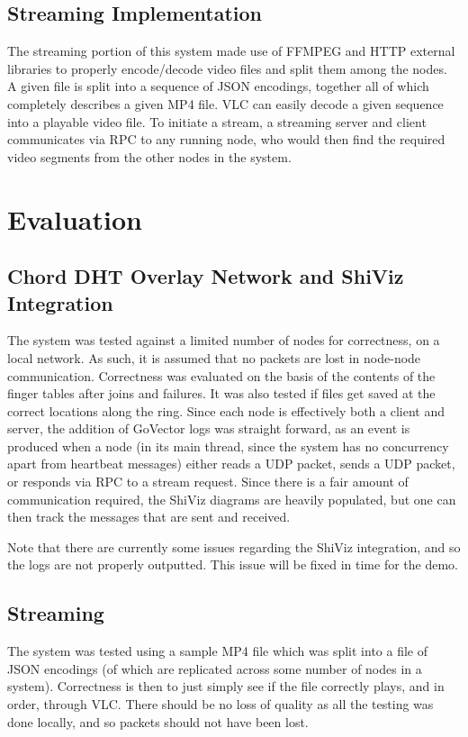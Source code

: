 \documentclass[fleqn,24pt]{SelfArx} %
\begin{document}
\subsection{Streaming Implementation}

The streaming portion of this system made use of FFMPEG and HTTP external libraries to properly encode/decode video files and split them among the nodes. A given file is split into a sequence of JSON encodings, together all of which completely describes a given MP4 file. VLC can easily decode a given sequence into a playable video file. To initiate a stream, a streaming server and client communicates via RPC to any running node, who would then find the required video segments from the other nodes in the system. 

\section{Evaluation}

\subsection{Chord DHT Overlay Network and ShiViz Integration}

The system was tested against a limited number of nodes for correctness, on a local network. As such, it is assumed that no packets are lost in node-node communication. Correctness was evaluated on the basis of the contents of the finger tables after joins and failures. It was also tested if files get saved at the correct locations along the ring. Since each node is effectively both a client and server, the addition of GoVector logs was straight forward, as an event is produced when a node (in its main thread, since the system has no concurrency apart from heartbeat messages) either reads a UDP packet, sends a UDP packet, or responds via RPC to a stream request. Since there is a fair amount of communication required, the ShiViz diagrams are heavily populated, but one can then track the messages that are sent and received.

Note that there are currently some issues regarding the ShiViz integration, and so the logs are not properly outputted. This issue will be fixed in time for the demo.

\subsection{Streaming}

The system was tested using a sample MP4 file which was split into a file of JSON encodings (of which are replicated across some number of nodes in a system). Correctness is then to just simply see if the file correctly plays, and in order, through VLC. There should be no loss of quality as all the testing was done locally, and so packets should not have been lost. 
\end{document}
